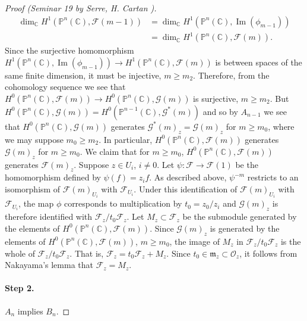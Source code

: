 \begin{proof}[Proof (Seminar 19 by Serre, H. Cartan \cite{bib:II:cartan-h:2})]
\[\begin{aligned}
\dim_{\mathbb{C}}H^1(\mathbb{P}^n(\mathbb{C}),\mathcal{F}(m-1))&=\dim_{\mathbb{C}}H^1(\mathbb{P}^n(\mathbb{C}),\operatorname{Im}(\phi_{m-1}))\\
&=\dim_{\mathbb{C}}H^1(\mathbb{P}^n(\mathbb{C}),\mathcal{F}(m)).
\end{aligned}
\]
Since the surjective homomorphism $H^1(\mathbb{P}^n(\mathbb{C}),\operatorname{Im}(\phi_{m-1}))\to H^1(\mathbb{P}^n(\mathbb{C}),\mathcal{F}(m))$ is between spaces of the same finite dimension, it must be injective, $m\geq m_2$. Therefore, from the cohomology sequence we see that $H^0(\mathbb{P}^n(\mathbb{C}),\mathcal{F}(m))\to H^0(\mathbb{P}^n(\mathbb{C}),\mathcal{G}(m))$ is surjective, $m\geq m_2$. But $H^0(\mathbb{P}^n(\mathbb{C}),\mathcal{G}(m))=H^0(\mathbb{P}^{n-1}(\mathbb{C}),\mathcal{G}^*(m))$ and so by $A_{n-1}$ we see that $H^0(\mathbb{P}^n(\mathbb{C}),\mathcal{G}(m))$ generates $\mathcal{G}^*(m)_z=\mathcal{G}(m)_z$ for $m\geq m_0$, where we may suppose $m_0\geq m_2$. In particular, $H^0(\mathbb{P}^n(\mathbb{C}),\mathcal{F}(m))$ generates $\mathcal{G}(m)_z$ for
$m\geq m_0$. We claim that for $m\geq m_0$, $H^0(\mathbb{P}^n(\mathbb{C}),\mathcal{F}(m))$ generates $\mathcal{F}(m)_z$. Suppose $z\in U_i$, $i\ne0$. Let $\psi:\mathcal{F}\to\mathcal{F}(1)$ be the homomorphism defined by $\psi(f)=z_i f$. As described above, $\psi^{-m}$ restricts to an isomorphism of $\mathcal{F}(m)_{U_i}$ with $\mathcal{F}_{U_i}$. Under this identification of $\mathcal{F}(m)_{U_i}$ with $\mathcal{F}_{U_i}$, the map $\phi$ corresponds to multiplication by $t_0=z_0/z_i$ and $\mathcal{G}(m)_z$ is therefore identified with $\mathcal{F}_z/t_0\mathcal{F}_z$. Let $M_z\subset\mathcal{F}_z$ be the submodule generated by the elements of $H^0(\mathbb{P}^n(\mathbb{C}),\mathcal{F}(m))$. Since $\mathcal{G}(m)_z$ is generated by the elements of $H^0(\mathbb{P}^n(\mathbb{C}),\mathcal{F}(m))$, $m\geq m_0$, the image of $M_z$ in $\mathcal{F}_z/t_0\mathcal{F}_z$ is the whole of $\mathcal{F}_z/t_0\mathcal{F}_z$. That is, $\mathcal{F}_z=t_0\mathcal{F}_z+M_z$. Since $t_0\in\mathfrak{m}_z\subset\mathcal{O}_z$, it follows from Nakayama's lemma that $\mathcal{F}_z=M_z$.

\paragraph{Step 2.} $A_n$ implies $B_n$.


\end{proof}
